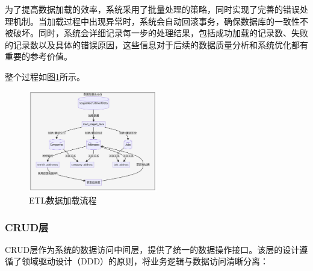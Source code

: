 为了提高数据加载的效率，系统采用了批量处理的策略，同时实现了完善的错误处理机制。当加载过程中出现异常时，系统会自动回滚事务，确保数据库的一致性不被破坏。同时，系统会详细记录每一步的处理结果，包括成功加载的记录数、失败的记录数以及具体的错误原因，这些信息对于后续的数据质量分析和系统优化都有重要的参考价值。

整个过程如图\ref{fig:ETL_load}所示。

\begin{figure}[htbp]
    \centering
    \includegraphics[width=0.5\textwidth]{figures/load.png}
    \caption{ETL数据加载流程}
    \label{fig:ETL_load}
\end{figure}

\subsubsection{CRUD层}
CRUD层作为系统的数据访问中间层，提供了统一的数据操作接口。该层的设计遵循了领域驱动设计（DDD）的原则，将业务逻辑与数据访问清晰分离：


